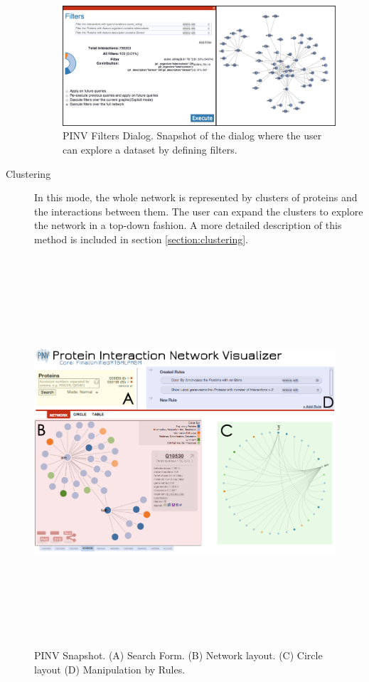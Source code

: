\begin{description}
\begin{figure}[ht]
\centering
\includegraphics[width=\textwidth]{figures/PinvFilters.png}
\caption[PINV Filters Dialog.]{PINV Filters Dialog. Snapshot of the dialog where the user can explore a dataset by defining filters.
\label{fig:pinv_filters}}
\end{figure}

\item[Clustering] In this mode, the whole network is represented by clusters of proteins and the interactions between them. The user can expand the clusters to explore the network in a top-down fashion. A more detailed description of this method is included in section \ref{section:clustering}.    \end{description}

\begin{figure}  
\includegraphics[height=5.7in,angle=90]{figures/pinv.png}
\caption[PINV Snapshot.]{PINV Snapshot. (A) Search Form. (B) Network layout. (C) Circle layout (D) Manipulation by Rules.
\label{fig:pinv}}
\end{figure}


